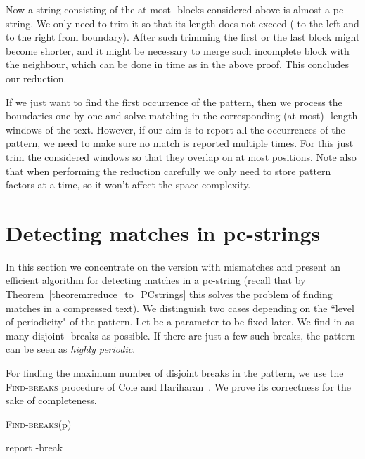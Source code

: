 \documentclass[runningheads]{llncs}
\newcommand{\proc}[1]{\textnormal{\scshape#1}}
\begin{document}
Now a string  consisting of the at most  -blocks considered above is almost a pc-string. We only need to trim it so that its length does not exceed  ( to the left and  to the right from boundary). After such trimming the first or the last block might become shorter, and it might be necessary to merge such incomplete block with the neighbour, which can be done in  time as in the above proof. This concludes our reduction.

If we just want to find the first occurrence of the pattern, then we process the boundaries one by one and solve matching in the corresponding (at most) -length windows of the text. However, if our aim is to report all the occurrences of the pattern, we need to make sure no match is reported multiple times. For this just trim the considered windows so that they overlap on at most  positions. Note also that when performing the reduction carefully we only need to store  pattern factors at a time, so it won't affect the space complexity.

\section{Detecting matches in pc-strings}
\label{section:weakly}

In this section we concentrate on the version with mismatches and present an efficient algorithm for detecting matches in a pc-string (recall that by Theorem~\ref{theorem:reduce_to_PCstrings} this solves the problem of finding matches in a compressed text).
We distinguish two cases depending on the ``level of periodicity" of the pattern. Let  be a parameter to be fixed later. We find in  as many disjoint -breaks as possible. If there are just a few such breaks, the pattern can be seen as {\it highly periodic}.

For finding the maximum number of disjoint breaks in the pattern, we use the \proc{Find-breaks} procedure of Cole and Hariharan~\cite{ColeHariharan}. We prove its correctness for the sake of completeness.

\begin{algorithm}[t]
\caption{\proc{Find-breaks}(p)}
\begin{algorithmic}[1]
\State 
\While{}
\State report -break 
\State 
\Else
\State 
\EndIf
\EndWhile
\end{algorithmic}
\end{algorithm}
\end{document}
